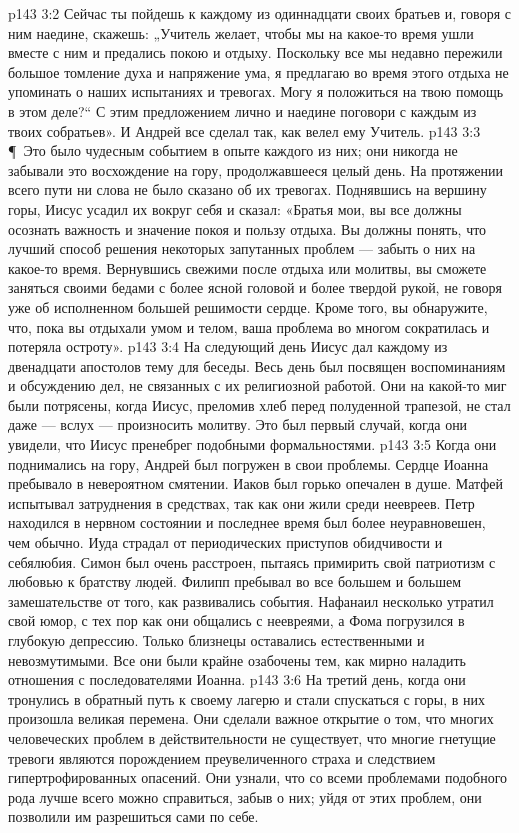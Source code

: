 \vs p143 3:2 Сейчас ты пойдешь к каждому из одиннадцати своих братьев и, говоря с ним наедине, скажешь: „Учитель желает, чтобы мы на какое\hyp{}то время ушли вместе с ним и предались покою и отдыху. Поскольку все мы недавно пережили большое томление духа и напряжение ума, я предлагаю во время этого отдыха не упоминать о наших испытаниях и тревогах. Могу я положиться на твою помощь в этом деле?“ С этим предложением лично и наедине поговори с каждым из твоих собратьев». И Андрей все сделал так, как велел ему Учитель.
\vs p143 3:3 \P\ Это было чудесным событием в опыте каждого из них; они никогда не забывали это восхождение на гору, продолжавшееся целый день. На протяжении всего пути ни слова не было сказано об их тревогах. Поднявшись на вершину горы, Иисус усадил их вокруг себя и сказал: «Братья мои, вы все должны осознать важность и значение покоя и пользу отдыха. Вы должны понять, что лучший способ решения некоторых запутанных проблем --- забыть о них на какое\hyp{}то время. Вернувшись свежими после отдыха или молитвы, вы сможете заняться своими бедами с более ясной головой и более твердой рукой, не говоря уже об исполненном большей решимости сердце. Кроме того, вы обнаружите, что, пока вы отдыхали умом и телом, ваша проблема во многом сократилась и потеряла остроту».
\vs p143 3:4 На следующий день Иисус дал каждому из двенадцати апостолов тему для беседы. Весь день был посвящен воспоминаниям и обсуждению дел, не связанных с их религиозной работой. Они на какой\hyp{}то миг были потрясены, когда Иисус, преломив хлеб перед полуденной трапезой, не стал даже --- вслух --- произносить молитву. Это был первый случай, когда они увидели, что Иисус пренебрег подобными формальностями.
\vs p143 3:5 Когда они поднимались на гору, Андрей был погружен в свои проблемы. Сердце Иоанна пребывало в невероятном смятении. Иаков был горько опечален в душе. Матфей испытывал затруднения в средствах, так как они жили среди неевреев. Петр находился в нервном состоянии и последнее время был более неуравновешен, чем обычно. Иуда страдал от периодических приступов обидчивости и себялюбия. Симон был очень расстроен, пытаясь примирить свой патриотизм с любовью к братству людей. Филипп пребывал во все большем и большем замешательстве от того, как развивались события. Нафанаил несколько утратил свой юмор, с тех пор как они общались с неевреями, а Фома погрузился в глубокую депрессию. Только близнецы оставались естественными и невозмутимыми. Все они были крайне озабочены тем, как мирно наладить отношения с последователями Иоанна.
\vs p143 3:6 На третий день, когда они тронулись в обратный путь к своему лагерю и стали спускаться с горы, в них произошла великая перемена. Они сделали важное открытие о том, что многих человеческих проблем в действительности не существует, что многие гнетущие тревоги являются порождением преувеличенного страха и следствием гипертрофированных опасений. Они узнали, что со всеми проблемами подобного рода лучше всего можно справиться, забыв о них; уйдя от этих проблем, они позволили им разрешиться сами по себе.
